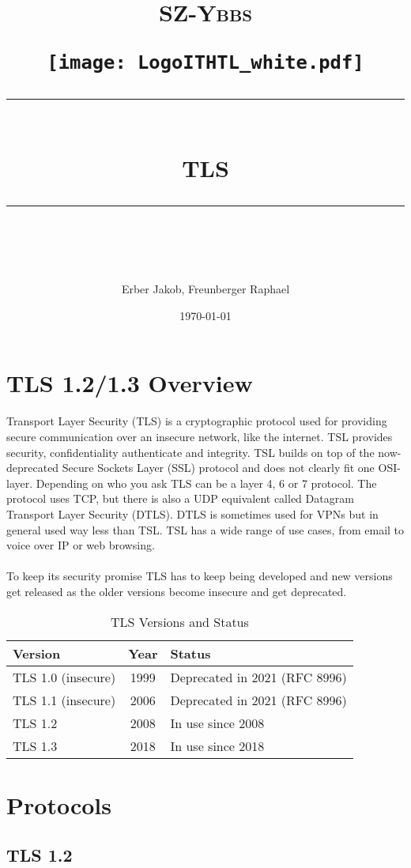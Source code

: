 \documentclass[11pt]{scrartcl} %
\title{	
	\normalfont\normalsize
	\begin{center}
		\begin{minipage}[c]{0.2\textwidth}
			\textsc{\Large SZ-Ybbs}
		\end{minipage}%
		\begin{minipage}[c]{0.1\textwidth}
			\texttt{[image: LogoITHTL\_white.pdf]}
		\end{minipage}
	\end{center}
	\vspace{10pt} %
	\rule{\linewidth}{0.5pt}\\ %
	\vspace{20pt} %
	{\huge TLS}\\ %
	\vspace{12pt} %
	\rule{\linewidth}{2pt}\\ %
	\vspace{12pt} %
}
\author{\LARGE Erber Jakob, Freunberger Raphael} %
\date{\normalsize\today} %
\begin{document}
\maketitle %

\section{TLS 1.2/1.3 Overview}

Transport Layer Security (TLS) is a cryptographic protocol used for providing secure communication over an insecure network, like the internet. TSL provides security, confidentiality authenticate and integrity. TSL builds on top of the now-deprecated Secure Sockets Layer (SSL) protocol and does not clearly fit one OSI-layer. Depending on who you ask TLS can be a layer 4, 6 or 7 protocol. The protocol uses TCP, but there is also a UDP equivalent called Datagram Transport Layer Security (DTLS). DTLS is sometimes used for VPNs but in general used way less than TSL. TSL has a wide range of use cases, from email to voice over IP or web browsing.
\\\\
To keep its security promise TLS has to keep being developed and new versions get released as the older versions become insecure and get deprecated.

\begin{table}[h]
    \centering
    \begin{tabular}{|l|c|l|}
        \hline
        \textbf{Version} & \textbf{Year} & \textbf{Status} \\ \hline
        TLS 1.0 (insecure) & 1999 & Deprecated in 2021 (RFC 8996) \\ \hline
        TLS 1.1 (insecure) & 2006 & Deprecated in 2021 (RFC 8996) \\ \hline
        TLS 1.2 & 2008 & In use since 2008 \\ \hline
        TLS 1.3 & 2018 & In use since 2018 \\ \hline
    \end{tabular}
    \caption{TLS Versions and Status}
    \label{tab:tls_versions}
\end{table}



\section{Protocols}

\subsection{TLS 1.2}
\end{document}
